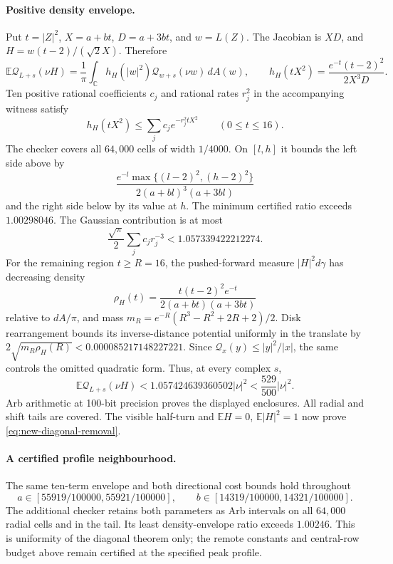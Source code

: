 \paragraph{Positive density envelope.}
Put $t=|Z|^2$, $X=a+bt$, $D=a+3bt$, and $w=L(Z)$. The Jacobian is $XD$, and $H=w(t-2)/(\sqrt2X)$. Therefore
\[
 \mathbb E\mathcal Q_{L+s}(\nu H)
 =\frac1\pi\int_{\mathbb C} h_H(|w|^2)\mathcal Q_{w+s}(\nu w)\,dA(w),
 \qquad h_H(tX^2)=\frac{e^{-t}(t-2)^2}{2X^3D}.
\]
Ten positive rational coefficients $c_j$ and rational rates $r_j^2$ in the accompanying witness satisfy
\[
 h_H(tX^2)\le\sum_j c_j e^{-r_j^2tX^2}\qquad(0\le t\le16).
\]
The checker covers all $64{,}000$ cells of width $1/4000$. On $[l,h]$ it bounds the left side above by
\[
 \frac{e^{-l}\max\{(l-2)^2,(h-2)^2\}}{2(a+bl)^3(a+3bl)}
\]
and the right side below by its value at $h$. The minimum certified ratio exceeds $1.00298046$. The Gaussian contribution is at most
\[
 \frac{\sqrt\pi}{2}\sum_j c_jr_j^{-3}<1.057339422212274.
\]
For the remaining region $t\ge R=16$, the pushed-forward measure $|H|^2d\gamma$ has decreasing density
\[
 \rho_H(t)=\frac{t(t-2)^2e^{-t}}{2(a+bt)(a+3bt)}
\]
relative to $dA/\pi$, and mass $m_R=e^{-R}(R^3-R^2+2R+2)/2$. Disk rearrangement bounds its inverse-distance potential uniformly in the translate by $2\sqrt{m_R\rho_H(R)}<0.000085217148227221$. Since $\mathcal Q_x(y)\le|y|^2/|x|$, the same controls the omitted quadratic form. Thus, at every complex $s$,
\[
 \mathbb E\mathcal Q_{L+s}(\nu H)
 <1.057424639360502|\nu|^2<\frac{529}{500}|\nu|^2.
\]
Arb arithmetic at 100-bit precision proves the displayed enclosures. All radial and shift tails are covered. The visible half-turn and $\mathbb EH=0$, $\mathbb E|H|^2=1$ now prove \eqref{eq:new-diagonal-removal}.


\paragraph{A certified profile neighbourhood.}
The same ten-term envelope and both directional cost bounds hold throughout
\[
 a\in[55919/100000,55921/100000],\qquad
 b\in[14319/100000,14321/100000].
\]
The additional checker retains both parameters as Arb intervals on all
$64{,}000$ radial cells and in the tail. Its least density-envelope ratio
exceeds $1.00246$. This is uniformity of the diagonal theorem only;
the remote constants and central-row budget above remain certified at
the specified peak profile.

